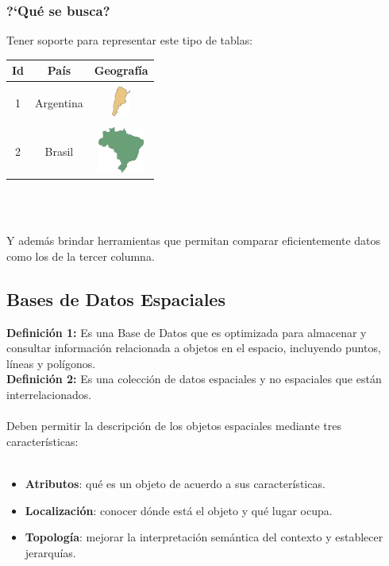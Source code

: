 \documentclass[a4paper,12pt,oneside]{report}
\begin{document}
\subsubsection*{?`Qu\'e se busca?}
Tener soporte para representar este tipo de tablas:\\
\begin{center}
\begin{tabular}{|c|c|c|}
\hline
Id & Pa\'is & Geograf\'ia \\
\hline
1 & Argentina & \includegraphics[width=0.6cm,height=1.2cm]{Imagenes/argentina.jpg}\\
\hline
2 & Brasil & \includegraphics[width=1.5cm,height=1.5cm]{Imagenes/brasil.jpg}\\
\hline
\end{tabular}\\
\end{center}
\ \\
Y adem\'as brindar herramientas que permitan comparar eficientemente datos como los de la tercer columna.

\subsection*{Bases de Datos Espaciales}
\textbf{Definici\'on 1:} Es una Base de Datos que es optimizada para almacenar y consultar informaci\'on relacionada a objetos en el espacio, incluyendo puntos, l\'ineas y pol\'igonos.\\
\textbf{Definici\'on 2:} Es una colecci\'on de datos espaciales y no espaciales que est\'an interrelacionados.\\
\ \\
Deben permitir la descripci\'on de los objetos espaciales mediante tres caracter\'isticas:\\
\ \\
\begin{itemize}
\item \textbf{Atributos}: qu\'e es un objeto de acuerdo a sus caracter\'isticas.
\item \textbf{Localizaci\'on}: conocer d\'onde est\'a el objeto y qu\'e lugar ocupa.
\item \textbf{Topolog\'ia}: mejorar la interpretaci\'on sem\'antica del contexto y establecer jerarqu\'ias.
\end{itemize}
\end{document}
